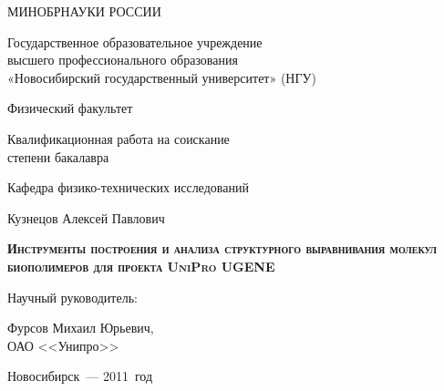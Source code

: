 \begin{titlepage}
\newpage

\thispagestyle{empty}
\begin {center}
МИНОБРНАУКИ РОССИИ

\vspace{0.3cm}

Государственное образовательное учреждение\\
высшего профессионального образования\\
«Новосибирский государственный университет» (НГУ)

\vspace{0.6cm}

Физический факультет

\vspace {2cm}

Квалификационная работа на соискание\\
степени бакалавра

\vspace {0.5cm}

Кафедра физико-технических исследований

\vspace {1cm}

Кузнецов Алексей Павлович

\vspace {1.5cm}

\textsc{\textbf{Инструменты построения и анализа структурного выравнивания молекул биополимеров для проекта UniPro UGENE}}

\vspace {1.5cm}

\begin{flushright}

Научный руководитель:

Фурсов Михаил Юрьевич,\\
ОАО <<Унипро>>

\end{flushright}

\vspace {3cm}

Новосибирск~--- 2011~год
\end{center}

\end{titlepage}

